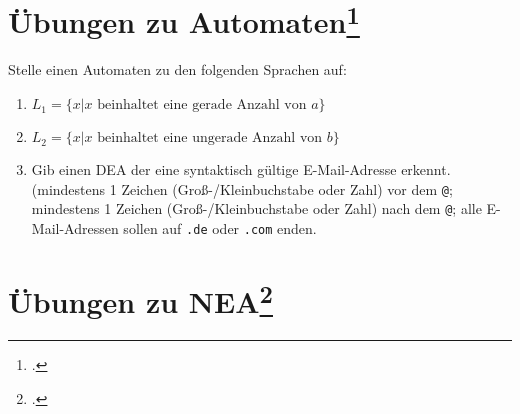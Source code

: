 \documentclass{lehramt-informatik-aufgabe}
\begin{document}
%

\section{Übungen zu Automaten\footcite[Seite 28]{theoinf:fs:1}}

Stelle einen Automaten zu den folgenden Sprachen auf:

\begin{enumerate}

%

\item $L_1 = \{ x | x \text{ beinhaltet eine gerade Anzahl von } a \}$

\item $L_2 = \{ x | x \text{ beinhaltet eine ungerade Anzahl von } b \}$

\item Gib einen DEA der eine syntaktisch gültige E-Mail-Adresse erkennt.
(mindestens 1 Zeichen (Groß-/Kleinbuchstabe oder Zahl) vor dem
\texttt{@}; mindestens 1 Zeichen (Groß-/Kleinbuchstabe oder Zahl) nach
dem \texttt{@}; alle E-Mail-Adressen sollen auf \texttt{.de} oder
\texttt{.com} enden.

\end{enumerate}

%

\section{Übungen zu NEA\footcite[Seite 34]{theoinf:fs:1}}
\end{document}
